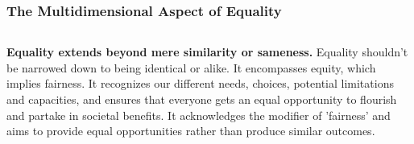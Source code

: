 \documentclass[5pt]{beamer}
\begin{document}
\begin{frame}
\frametitle{The Multidimensional Aspect of Equality}
\begin{columns}
\begin{column}{0.7\textwidth}
\begin{block}{\textbf{Equality extends beyond mere similarity or sameness.}}
Equality shouldn't be narrowed down to being identical or alike. It encompasses equity, which implies fairness. It recognizes our different needs, choices, potential limitations and capacities, and ensures that everyone gets an equal opportunity to flourish and partake in societal benefits. It acknowledges the modifier of 'fairness' and aims to provide equal opportunities rather than produce similar outcomes.
\end{block}
\end{column}
\end{columns}
\end{frame}
\end{document}
